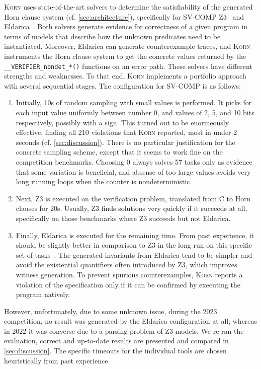 \documentclass{llncs}
\newcommand{\Korn}{\textsc{Korn}\xspace}
\begin{document}
\Korn uses state-of-the-art solvers to determine the satisfiability of the generated Horn clause system (cf. \cref{sec:architecture}),
specifically for SV-COMP Z3~\cite{bjorner2013solving} and Eldarica~\cite{hojjat2018eldarica}.
Both solvers generate evidence for correctness of a given program in terms of models that describe how the unknown predicates need to be instantiated.
Moreover, Eldarica can generate counterexample traces, and \Korn instruments the Horn clause system to get
the concrete values returned by the \texttt{\_\_VERIFIER\_nondet\_*()} functions on an error path.
These solvers have different strengths and weaknesses.
To that end, \Korn implements a portfolio approach with several sequential stages.
The configuration for SV-COMP is as follows:
\begin{enumerate}
    \item Initially, 10s of random sampling with small values is performed.
          It picks for each input value uniformly between number 0, and values of 2, 5, and 10 bits respectively, possibly with a sign.
          This turned out to be enormeously effective,
          finding all 210 violations that \Korn reported, most in under 2 seconds
          (cf. \cref{sec:discussion}).
          There is no particular justification for the concrete sampling scheme,
          except that it seems to work fine on the competition benchmarks.
          Choosing 0 always solves 57 tasks only as evidence that some variation is beneficial,
          and absense of too large values avoids very long running loops
          when the counter is nondeterministic.

    \item Next, Z3 is executed on the verification problem, translated from C to Horn clauses for 20s. Usually, Z3 finds solutions very quickly if it succeeds at all,
          specifically on those benchmarks where Z3 succeeds but not Eldarica.
    \item Finally, Eldarica is executed for the remaining time.
          From past experience, it should be slightly better in comparison to Z3 in the long run on this specific set of tasks~\cite{ernst:arxiv2020:summaries}.
    The generated invariants from Eldarica tend to be simpler and avoid the existential quantifiers
    often introduced by Z3, which improves witness generation.
    To prevent spurious counterexamples,
    \Korn reports a violation of the specification only if it can be confirmed by executing the program natively.
\end{enumerate}
However, unfortunately, due to some unknown issue, during the 2023 competition,
no result was generated by the Eldarica configuration at all;
whereas in 2022 it was converse due to a parsing problem of Z3 models.
We re-ran the evaluation, correct and up-to-date results are presented and compared in \cref{sec:discussion}.
The specific timeouts for the individual tools
are chosen heuristically from past experience.
\end{document}
